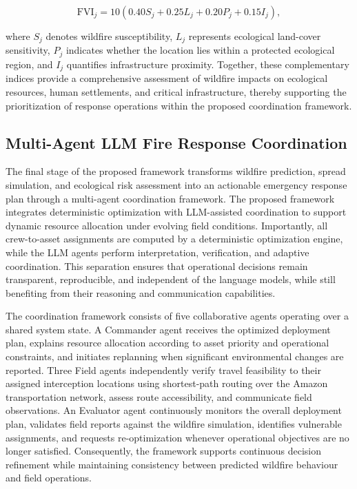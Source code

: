\documentclass{ieeeaccess}
\begin{document}
\begin{equation}
\text{FVI}_j
=
10
\left(
0.40S_j
+
0.25L_j
+
0.20P_j
+
0.15I_j
\right),
\label{eq:fvi}
\end{equation}

where $S_j$ denotes wildfire susceptibility, $L_j$ represents ecological land-cover sensitivity, $P_j$ indicates whether the location lies within a protected ecological region, and $I_j$ quantifies infrastructure proximity. Together, these complementary indices provide a comprehensive assessment of wildfire impacts on ecological resources, human settlements, and critical infrastructure, thereby supporting the prioritization of response operations within the proposed coordination framework.

\subsection{Multi-Agent LLM Fire Response Coordination}
\label{sec:coord}

The final stage of the proposed framework transforms wildfire prediction, spread simulation, and ecological risk assessment into an actionable emergency response plan through a multi-agent coordination framework. The proposed framework integrates deterministic optimization with LLM-assisted coordination to support dynamic resource allocation under evolving field conditions. Importantly, all crew-to-asset assignments are computed by a deterministic optimization engine, while the LLM agents perform interpretation, verification, and adaptive coordination. This separation ensures that operational decisions remain transparent, reproducible, and independent of the language models, while still benefiting from their reasoning and communication capabilities.

The coordination framework consists of five collaborative agents operating over a shared system state. A Commander agent receives the optimized deployment plan, explains resource allocation according to asset priority and operational constraints, and initiates replanning when significant environmental changes are reported. Three Field agents independently verify travel feasibility to their assigned interception locations using shortest-path routing over the Amazon transportation network, assess route accessibility, and communicate field observations. An Evaluator agent continuously monitors the overall deployment plan, validates field reports against the wildfire simulation, identifies vulnerable assignments, and requests re-optimization whenever operational objectives are no longer satisfied. Consequently, the framework supports continuous decision refinement while maintaining consistency between predicted wildfire behaviour and field operations.
\end{document}
